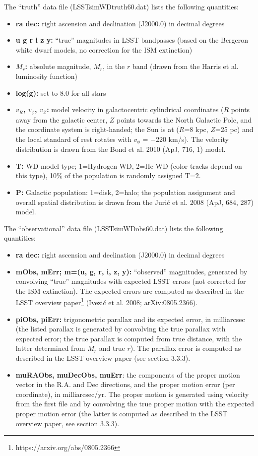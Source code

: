 The “truth” data file (LSSTsimWDtruth60.dat) lists the following quantities:
\begin{itemize}
\item {\bf ra dec:} right ascension and declination (J2000.0)
 in decimal degrees 
\item {\bf u g r i z y:} ``true'' magnitudes in LSST bandpasses (based on the
Bergeron white dwarf models, no correction for the ISM extinction)
\item {\bf $M_r$:} absolute magnitude, $M_r$, in the $r$ band (drawn from the 
    Harris et al. luminosity function)
\item {\bf log(g):} set to 8.0 for all stars
\item {\bf $v_R$, $v_\phi$, $v_Z$:} model velocity in galactocentric cylindrical coordinates 
($R$ points away from the galactic center, $Z$ points towards the North Galactic Pole, and 
the coordinate system is right-handed; the Sun is at ($R$=8 kpc, $Z$=25 pc) and the local 
standard of rest rotates with $v_\phi$ = $−$220 km/s). The velocity distribution is drawn 
from the Bond et al. 2010 (ApJ, 716, 1) model.
\item {\bf T:} WD model type; 1=Hydrogen WD, 2=He WD (color tracks depend on this type), 
10\% of the population is randomly assigned T=2.
\item {\bf P:} Galactic population: 1=disk, 2=halo; the population assignment and overall spatial 
distribution is drawn from the Juri\'{c} et al. 2008 (ApJ, 684, 287) model.
\end{itemize}

The “observational” data file (LSSTsimWDobs60.dat) lists the following quantities:
\begin{itemize}
\item {\bf ra dec:} right ascension and declination (J2000.0)  in decimal degrees 
\item {\bf mObs, mErr; m=(u, g, r, i, z, y):} ``observed'' magnitudes, generated by convolving 
``true'' magnitudes with expected LSST errors (not corrected for the ISM extinction). The expected 
errors are computed as described in the LSST overview paper\footnote{https://arxiv.org/abs/0805.2366} 
(Ivezi\'{c} et al. 2008; arXiv:0805.2366).
\item {\bf piObs, piErr:} trigonometric parallax and its expected error, in milliarcsec (the listed 
parallax is generated by convolving the true parallax with expected error; the true parallax is 
computed from true distance, with the latter determined from $M_r$ and true $r$). The parallax 
error is computed as described in the LSST overview paper (see section 3.3.3).
\item {\bf muRAObs, muDecObs, muErr}: the components of the proper motion vector in the 
R.A. and Dec directions, and the proper motion error (per coordinate), in milliarcsec/yr. The proper 
motion is generated using velocity from the first file and by convolving the true proper motion 
with the expected proper motion error (the latter is computed as described in the LSST 
overview paper, see section 3.3.3).
\end{itemize}



